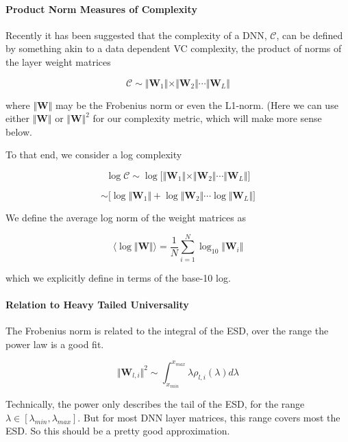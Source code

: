 
\paragraph{Product Norm Measures of Complexity}

Recently it has been suggested that the complexity of a DNN, $\mathcal{C}$,  can be defined by something akin to a data dependent VC complexity, the product of norms of the layer weight matrices

$$\mathcal{C}\sim\Vert\mathbf{W}_{1}\Vert\times\Vert\mathbf{W}_{2}\Vert\cdots\Vert\mathbf{W}_{L}\Vert$$

where $\Vert\mathbf{W}\Vert$ may be the Frobenius norm or even the L1-norm.  (Here we can use either  $\Vert\mathbf{W}\Vert$ or $\Vert\mathbf{W}\Vert^{2}$ for our complexity metric, which will make more sense below.


 To that end, we consider a log complexity

$$\log\mathcal{C}\sim\log\bigg[\Vert\mathbf{W}_{1}\Vert\times\Vert\mathbf{W}_{2}\Vert\cdots\Vert\mathbf{W}_{L}\Vert\bigg]$$

$$\sim\bigg[\log\Vert\mathbf{W}_{1}\Vert+\log\Vert\mathbf{W}_{2}\Vert\cdots\log\Vert\mathbf{W}_{L}\Vert\bigg]$$

We define the average log norm of the weight matrices as

$$\langle\log\Vert\mathbf{W}\Vert\rangle=\dfrac{1}{N}\sum_{i=1}^{N}\log_{10}\Vert\mathbf{W}_{i}\Vert$$

which we explicitly define in terms of the base-10 log.

\paragraph{Relation to Heavy Tailed Universality}

The Frobenius norm is related to the integral of the ESD, over the range the power law is a good fit. 

$$\Vert\mathbf{W}_{l,i}\Vert^{2}\sim\int_{x_{min}}^{x_{max}}\lambda\rho_{l,i}(\lambda)d\lambda$$

Technically, the power only describes the tail of the ESD,  for the range $\lambda\in[\lambda_{min},\lambda_{max}]$.
  But for most DNN layer matrices, this range covers most the ESD.  So this should be a pretty good approximation.

